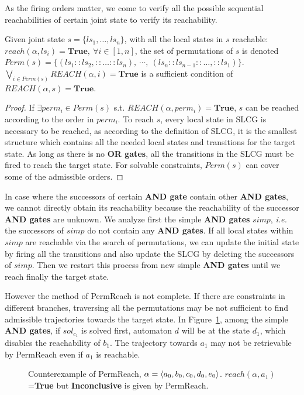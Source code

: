 \documentclass[runningheads]{llncs}
\DeclarePairedDelimiter{\init}{\langle}{\rangle}
\begin{document}
As the firing orders matter, we come to verify all the possible sequential reachabilities of certain joint state to verify its reachability.

\begin{proposition}\label{theoperm}
Given joint state $s=\{ls_1,\ldots,ls_n\}$, with all the local states in $s$ reachable: $reach(\alpha,ls_i)=\mathbf{True},\ \forall i\in[1,n]$, the set of permutations of $s$ is denoted $Perm(s)=\{(ls_1::ls_2,::\ldots ::ls_n),\ \cdots,\ (ls_n::ls_{n-1}::\ldots,::ls_1)\}$. $\bigvee_{i\in Perm(s)} REACH(\alpha,i)=\mathbf{True}$ is a sufficient condition of $REACH(\alpha,s)=\mathbf{True}$.
\end{proposition}
\begin{proof}
If $\exists perm_i\in Perm(s)$ s.t. $REACH(\alpha,perm_i)=\mathbf{True}$, $s$ can be reached according to the order in $perm_i$.
To reach $s$, every local state in SLCG is necessary to be reached, as according to the definition of SLCG, it is the smallest structure which contains all the needed local states and transitions for the target state. As long as there is no \textbf{OR gates}, all the transitions in the SLCG must be fired to reach the target state.
For solvable constraints, $Perm(s)$ can cover some of the admissible orders.
\end{proof}

In case where the successors of certain \textbf{AND gate} contain other \textbf{AND gates}, we cannot directly obtain its reachability because the reachability of the successor \textbf{AND gates} are unknown.
We analyze first the simple \textbf{AND gates} $simp$, \textit{i.e.} the successors of $simp$ do not contain any \textbf{AND gates}.
If all local states within $simp$ are reachable via the search of permutations, we can update the initial state by firing all the transitions and also update the SLCG by deleting the successors of $simp$. 
Then we restart this process from new simple \textbf{AND gates} until we reach finally the target state.

However the method of PermReach is not complete. 
If there are constraints in different branches, traversing all the permutations may be not sufficient to find admissible trajectories towards the target state.
In Figure~\ref{FigConflictInForks}, among the simple \textbf{AND gates}, if $sol_{c_1}$ is solved first, automaton $d$ will be at the state $d_1$, which disables the reachability of $b_1$.
The trajectory towards $a_1$ may not be retrievable by PermReach even if $a_1$ is reachable.
\begin{figure}[ht]
\centering

\caption{Counterexample of PermReach, $\alpha=\init{ a_0,b_0,c_0,d_0,e_0}$. 
$reach(\alpha,a_1)$=\textbf{True} but \textbf{Inconclusive} is given by PermReach.
}\label{FigConflictInForks}
\end{figure}
\end{document}
